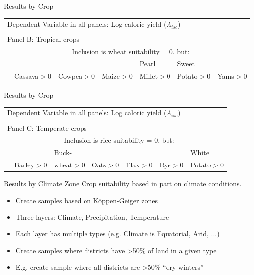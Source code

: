 \documentclass[10pt, xcolor=dvipsnames]{beamer}
\begin{document}
\begin{frame}{Results by Crop}

{\scriptsize
\begin{tabularx}{\textwidth}{lXXXXXX}
\midrule
\multicolumn{7}{l}{Dependent Variable in all panels: Log caloric yield ($A_{isc}$)} \\ \\
\multicolumn{7}{l}{Panel B: Tropical crops} \\
                   & \multicolumn{6}{c}{Inclusion is wheat suitability = 0, but:} \\ \cmidrule(lr){2-7}
                   &            &              &          &   Pearl       &  Sweet      & \\
& Cassava$>$0 & Cowpea$>$0  & Maize$>$0 & Millet$>$0 & Potato$>$0 & Yams$>$0   \\
\midrule

\midrule
\end{tabularx}
}

\end{frame}

\begin{frame}{Results by Crop}

{\scriptsize
\begin{tabularx}{\textwidth}{lXXXXXX}
\midrule
\multicolumn{7}{l}{Dependent Variable in all panels: Log caloric yield ($A_{isc}$)} \\ \\
\multicolumn{7}{l}{Panel C: Temperate crops} \\
                   & \multicolumn{6}{c}{Inclusion is rice suitability = 0, but:} \\ \cmidrule(lr){2-7}
                   &            & Buck-        &          &          &         & White \\
                   & Barley$>$0 & wheat$>$0  & Oats$>$0 & Flax$>$0 & Rye$>$0 & Potato$>$0   \\
\midrule

\midrule
\end{tabularx}
}
\end{frame}

\begin{frame}{Results by Climate Zone}
Crop suitability based in part on climate conditions. 
\begin{itemize}
  \item Create samples based on K{\"o}ppen-Geiger zones
  \item Three layers: Climate, Precipitation, Temperature
  \item Each layer has multiple types (e.g. Climate is Equatorial, Arid, ...)
  \item Create samples where districts have >50\% of land in a given type
  \item E.g. create sample where all districts are >50\% ``dry winters''
\end{itemize}
\end{frame}
\end{document}
